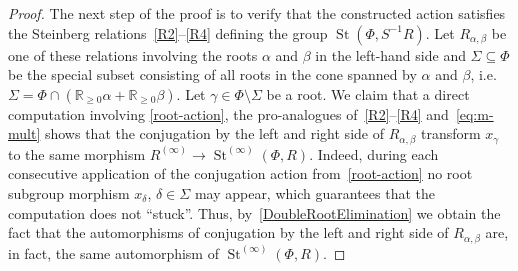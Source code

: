 \documentclass[oneside, 11pt]{amsart}
\numberwithin{equation}{section}
\theoremstyle{definition}
\theoremstyle{remark}
\DeclareMathOperator\St{St}
\begin{document}
\begin{proof}
 The next step of the proof is to verify that the constructed action satisfies the Steinberg relations~\eqref{R2}--\eqref{R4} defining the group $\St(\Phi, S^{-1}R)$.
 Let $R_{\alpha, \beta}$ be one of these relations involving the roots $\alpha$ and $\beta$ in the left-hand side and $\Sigma \subseteq \Phi$ be the special subset consisting of all roots in the cone spanned by $\alpha$ and $\beta$, i.e. $\Sigma = \Phi \cap (\mathbb R_{\geq 0} \alpha + \mathbb R_{\geq 0} \beta)$. Let $\gamma \in \Phi \setminus \Sigma$ be a root. We claim that a direct computation involving \cref{root-action}, the pro-analogues of~\eqref{R2}--\eqref{R4} and~\eqref{eq:m-mult} shows that the conjugation by the left and right side of $R_{\alpha, \beta}$ transform $x_\gamma$ to the same morphism $R^{(\infty)} \to \St^{(\infty)}(\Phi, R)$.
 Indeed, during each consecutive application of the conjugation action from~\cref{root-action} no root subgroup morphism $x_\delta$, $\delta \in \Sigma$ may appear, which guarantees that the computation does not ``stuck''. Thus, by~\cref{DoubleRootElimination} we obtain the fact that the automorphisms of conjugation by the left and right side of $R_{\alpha,\beta}$ are, in fact, the same automorphism of $\St^{(\infty)}(\Phi, R)$.

 

\end{proof}
\end{document}

